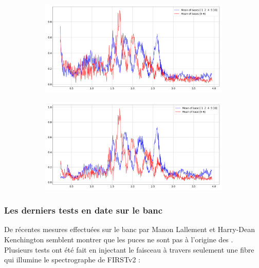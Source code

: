 \begin{figure}[ht!]
    \centering
    \begin{subfigure}{0.8\textwidth}
        \centering
        \includegraphics[width=\textwidth]{Figure_Chap4/20221010_Binary_01_Bin01_SpeDiffPhaseMean_fftBaseMean_Pola1.png}
        \caption{}
        \label{fig:WigglesPhaseDiffMeanA}
    \end{subfigure}
    \begin{subfigure}{0.8\textwidth}
        \centering
        \includegraphics[width=\textwidth]{Figure_Chap4/20221010_Binary_01_Bin01_SpeDiffPhaseCal_fftBaseMean_Pola1.png}
        \caption{}
        \label{fig:WigglesPhaseDiffMeanB}
    \end{subfigure}
    \caption[]{}
    \label{fig:WigglesPhaseDiffMean}
\end{figure}


\subsubsection{Les derniers tests en date sur le banc}

De récentes mesures effectuées sur le banc par Manon Lallement et Harry-Dean Kenchington semblent montrer que les puces ne sont pas à l'origine des \wiggles. Plusieurs tests ont été fait en injectant le faisceau à travers seulement une fibre qui illumine le spectrographe de \ac{FIRSTv2} :

